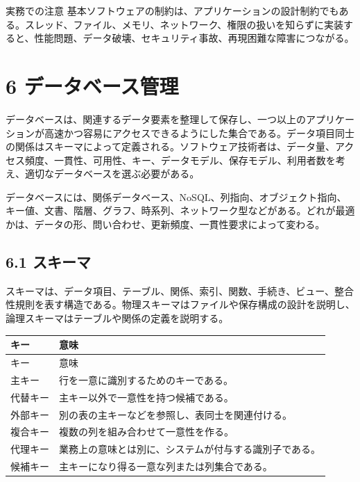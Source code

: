 \documentclass[a4paper,11pt]{ltjsarticle}
\begin{document}
\begin{importantbox}{実務での注意}
基本ソフトウェアの制約は、アプリケーションの設計制約でもある。スレッド、ファイル、メモリ、ネットワーク、権限の扱いを知らずに実装すると、性能問題、データ破壊、セキュリティ事故、再現困難な障害につながる。

\end{importantbox}

\section{6 データベース管理}

データベースは、関連するデータ要素を整理して保存し、一つ以上のアプリケーションが高速かつ容易にアクセスできるようにした集合である。データ項目同士の関係はスキーマによって定義される。ソフトウェア技術者は、データ量、アクセス頻度、一貫性、可用性、キー、データモデル、保存モデル、利用者数を考え、適切なデータベースを選ぶ必要がある。

データベースには、関係データベース、NoSQL、列指向、オブジェクト指向、キー値、文書、階層、グラフ、時系列、ネットワーク型などがある。どれが最適かは、データの形、問い合わせ、更新頻度、一貫性要求によって変わる。

\subsection{6.1 スキーマ}

スキーマは、データ項目、テーブル、関係、索引、関数、手続き、ビュー、整合性規則を表す構造である。物理スキーマはファイルや保存構成の設計を説明し、論理スキーマはテーブルや関係の定義を説明する。

\begin{longtable}{>{\raggedright\arraybackslash}p{}>{\raggedright\arraybackslash}p{}}
\toprule
キー & 意味 \\
\midrule
\endfirsthead
\toprule
キー & 意味 \\
\midrule
\endhead
主キー & 行を一意に識別するためのキーである。 \\
代替キー & 主キー以外で一意性を持つ候補である。 \\
外部キー & 別の表の主キーなどを参照し、表同士を関連付ける。 \\
複合キー & 複数の列を組み合わせて一意性を作る。 \\
代理キー & 業務上の意味とは別に、システムが付与する識別子である。 \\
候補キー & 主キーになり得る一意な列または列集合である。 \\
\bottomrule
\end{longtable}
\end{document}
